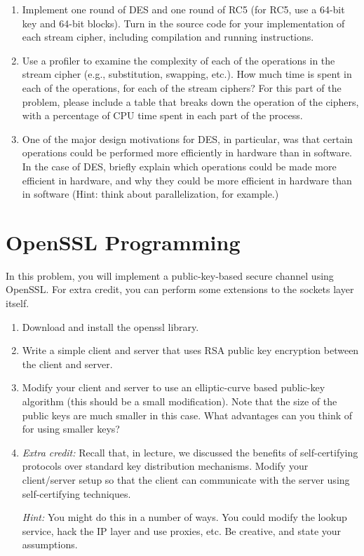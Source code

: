 \documentclass[11pt]{article}
\begin{document}
\begin{enumerate}
\item Implement one round of DES and one round of RC5 (for RC5, use a
  64-bit key and 64-bit blocks).  Turn in the source code for your
  implementation of each stream cipher, including compilation and
  running instructions.  

\item Use a profiler to examine the complexity of each of the operations
  in the stream cipher (e.g., substitution, swapping, etc.).  How much
  time is spent in each of the operations, for each of the stream
  ciphers?  For this part of the problem, please include a table that
  breaks down the operation of the ciphers, with a percentage of CPU
  time spent in each part of the process.
\item One of the major design motivations for DES, in particular, was
  that certain operations could be performed more efficiently in
  hardware than in software.  In the case of DES, briefly explain which
  operations could be made more efficient in hardware, and why they
  could be more efficient in hardware than in software (Hint: think
  about parallelization, for example.)
\end{enumerate}

\section{OpenSSL Programming}

In this problem, you will implement a public-key-based secure channel
using OpenSSL.  For extra credit, you can perform some extensions to the
sockets layer itself.

\begin{enumerate}
\item Download and install the openssl library.
\item Write a simple client and server that uses RSA public key
  encryption between the client and server.  
\item Modify your client and server to use an elliptic-curve based
  public-key algorithm (this should be a small modification).  Note that
  the size of the public keys are much smaller in this case.  What
  advantages can you think of for using smaller keys?
\item {\em Extra credit:} Recall that, in lecture, we discussed the
  benefits of self-certifying protocols over standard key distribution
  mechanisms.  Modify your client/server setup so that the client can
  communicate with the server using self-certifying techniques.

  {\em Hint:} You might do this in a number of ways.  You could modify
  the lookup service, hack the IP layer and use proxies, etc.  Be
  creative, and state your assumptions. 
\end{enumerate}
\end{document}
